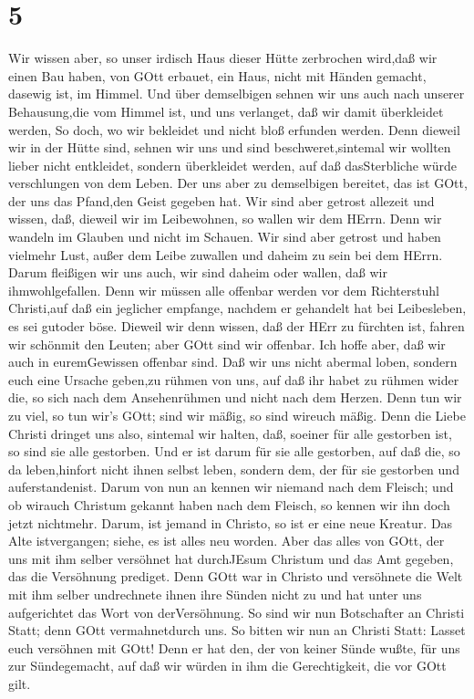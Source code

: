 \hypertarget{section-4}{%
\section{5}\label{section-4}}

 Wir wissen aber, so unser irdisch Haus dieser Hütte
zerbrochen wird,daß wir einen Bau haben, von GOtt erbauet, ein Haus,
nicht mit Händen gemacht, dasewig ist, im Himmel.  Und über
demselbigen sehnen wir uns auch nach unserer Behausung,die vom Himmel
ist, und uns verlanget, daß wir damit überkleidet werden, 
So doch, wo wir bekleidet und nicht bloß erfunden werden. 
Denn dieweil wir in der Hütte sind, sehnen wir uns und sind
beschweret,sintemal wir wollten lieber nicht entkleidet, sondern
überkleidet werden, auf daß dasSterbliche würde verschlungen von dem
Leben.  Der uns aber zu demselbigen bereitet, das ist GOtt,
der uns das Pfand,den Geist gegeben hat.  Wir sind aber
getrost allezeit und wissen, daß, dieweil wir im Leibewohnen, so wallen
wir dem HErrn.  Denn wir wandeln im Glauben und nicht im
Schauen.  Wir sind aber getrost und haben vielmehr Lust,
außer dem Leibe zuwallen und daheim zu sein bei dem HErrn. 
Darum fleißigen wir uns auch, wir sind daheim oder wallen, daß wir
ihmwohlgefallen.  Denn wir müssen alle offenbar werden vor
dem Richterstuhl Christi,auf daß ein jeglicher empfange, nachdem er
gehandelt hat bei Leibesleben, es sei gutoder böse. 
Dieweil wir denn wissen, daß der HErr zu fürchten ist, fahren wir
schönmit den Leuten; aber GOtt sind wir offenbar. Ich hoffe aber, daß
wir auch in euremGewissen offenbar sind.  Daß wir uns nicht
abermal loben, sondern euch eine Ursache geben,zu rühmen von uns, auf
daß ihr habet zu rühmen wider die, so sich nach dem Ansehenrühmen und
nicht nach dem Herzen.  Denn tun wir zu viel, so tun wir's
GOtt; sind wir mäßig, so sind wireuch mäßig.  Denn die
Liebe Christi dringet uns also, sintemal wir halten, daß, soeiner für
alle gestorben ist, so sind sie alle gestorben.  Und er ist
darum für sie alle gestorben, auf daß die, so da leben,hinfort nicht
ihnen selbst leben, sondern dem, der für sie gestorben und
auferstandenist.  Darum von nun an kennen wir niemand nach
dem Fleisch; und ob wirauch Christum gekannt haben nach dem Fleisch, so
kennen wir ihn doch jetzt nichtmehr.  Darum, ist jemand in
Christo, so ist er eine neue Kreatur. Das Alte istvergangen; siehe, es
ist alles neu worden.  Aber das alles von GOtt, der uns mit
ihm selber versöhnet hat durchJEsum Christum und das Amt gegeben, das
die Versöhnung prediget.  Denn GOtt war in Christo und
versöhnete die Welt mit ihm selber undrechnete ihnen ihre Sünden nicht
zu und hat unter uns aufgerichtet das Wort von derVersöhnung.
 So sind wir nun Botschafter an Christi Statt; denn GOtt
vermahnetdurch uns. So bitten wir nun an Christi Statt: Lasset euch
versöhnen mit GOtt!  Denn er hat den, der von keiner Sünde
wußte, für uns zur Sündegemacht, auf daß wir würden in ihm die
Gerechtigkeit, die vor GOtt gilt.

